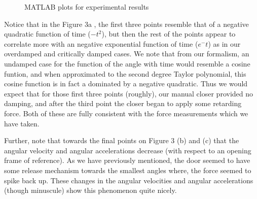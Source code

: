 \begin{figure}[htbp]
        \caption{MATLAB plots for experimental results}
        \end{figure}\par
        Notice that in the Figure 3a , the first three points resemble that of a negative quadratic function of time ($-t^{2}$), but then the rest of the points appear to correlate more with an negative exponential function of time ($e^-{t}$) as in our overdamped and critically damped cases. We note that from our formalism, an undamped case for the function of the angle with time would resemble a cosine funtion, and when approximated to the second degree Taylor polynomial, this cosine function is in fact a dominated by a negative quadratic. Thus we would expect that for those first three points (roughly), our manual closer provided no damping, and after the third point the closer began to apply some retarding force. Both of these are fully consistent with the force measurements which we have taken. \par
        Further, note that towards the final points on Figure 3 (b) and (c) that the angular velocity and angular accelerations decrease (with respect to an opening frame of reference). As we have previously mentioned, the door seemed to have some release mechanism towards the smallest angles where, the force seemed to spike back up. These changes in the angular velocities and angular accelerations (though minuscule) show this phenomenon quite nicely.
        